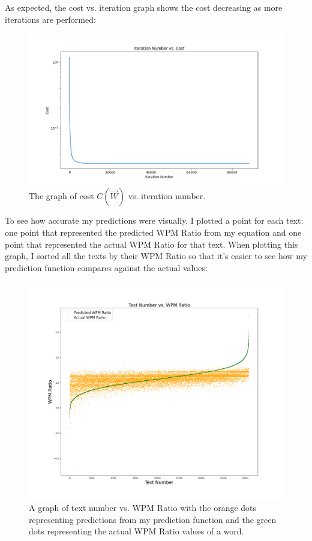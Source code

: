 \documentclass[12pt]{article}
\begin{document}
As expected, the cost vs. iteration graph shows the cost decreasing as more iterations are performed:
\begin{figure}[H]
	\caption{The graph of cost $C(\vec{W})$ vs. iteration number.}
	\includegraphics{cost.png}
\end{figure}

To see how accurate my predictions were visually, I plotted a point for each text: one point that represented the predicted WPM Ratio from my equation and one point that represented the actual WPM Ratio for that text. When plotting this graph, I sorted all the texts by their WPM Ratio so that it's easier to see how my prediction function compares against the actual values:

\begin{figure}[H]
	\caption{A graph of text number vs. WPM Ratio with the orange dots representing predictions from my prediction function and the green dots representing the actual WPM Ratio values of a word.}
	\includegraphics[width=\textwidth]{predictions.png}
\end{figure}
\end{document}
